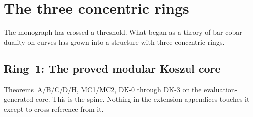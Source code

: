 \section{The three concentric rings}
\label{sec:three-rings}

The monograph has crossed a threshold.  What began as a theory of
bar-cobar duality on curves has grown into a structure with three
concentric rings.

\subsection*{Ring~1: The proved modular Koszul core}
Theorems~A/B/C/D/H, MC1/MC2, DK-0 through DK-3 on the
evaluation-generated core.  This is the spine.  Nothing in
the extension appendices touches it except to cross-reference
from it.

